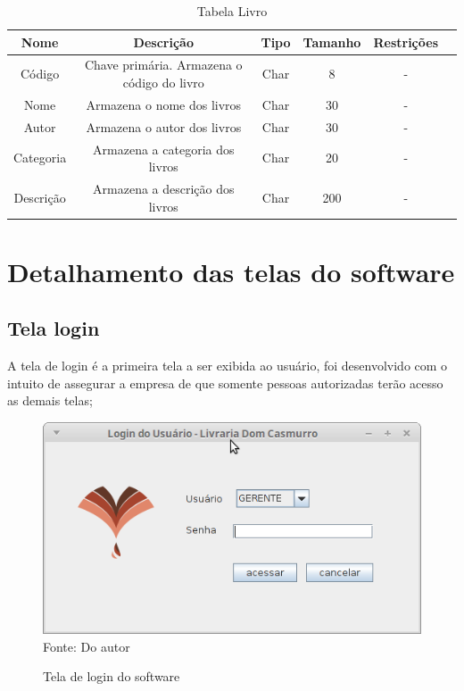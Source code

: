 \begin{table}[H]
\caption{Tabela Livro}
\begin{center}
\begin{tabular}{|c|c|c|c|c|c|}
\hline
Nome & Descrição & Tipo & Tamanho & Restrições \\ \hline
 Código & Chave primária. Armazena o código do livro & Char & 8 & - \\ \hline
 Nome  & Armazena o nome dos livros & Char & 30 &- \\ \hline
 Autor & Armazena o autor dos livros & Char & 30 &- \\ \hline
 Categoria  & Armazena a categoria dos livros  & Char & 20 &- \\ \hline
 Descrição  & Armazena a descrição dos livros  & Char & 200 &- \\ \hline
\end{tabular}
\end{center}
\label{tabela_livro}
\end{table}




\newpage
\section{Detalhamento das telas do software}

\subsection{Tela login}

 A tela de login é a primeira tela a ser exibida ao usuário, foi desenvolvido com o intuito de assegurar a empresa de que somente pessoas autorizadas terão acesso as demais telas;

 \begin{figure}[H]
	\centering 
	\caption{Tela de login do software}
	\label{login software}
	\includegraphics[scale = 0.7]{imagens/tela-login.png}
	\\Fonte: Do autor
\end{figure}

